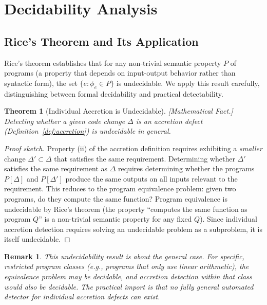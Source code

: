 \documentclass[11pt, a4paper, logo, copyright]{googledeepmind}
\newtheorem{theorem}{Theorem}[section]
\newtheorem*{remark}{Remark}
\begin{document}
\section{Decidability Analysis}
\label{sec:decidability}

\subsection{Rice's Theorem and Its Application}

Rice's theorem \citep{rice1953} establishes that for any non-trivial semantic property $P$ of programs (a property that depends on input-output behavior rather than syntactic form), the set $\{e : \phi_e \in P\}$ is undecidable. We apply this result carefully, distinguishing between formal decidability and practical detectability.

\begin{theorem}[Individual Accretion is Undecidable]
\label{thm:undecidable}
\emph{[Mathematical Fact.]} Detecting whether a given code change $\Delta$ is an accretion defect (Definition~\ref{def:accretion}) is undecidable in general.
\end{theorem}

\begin{proof}[Proof sketch]
Property (ii) of the accretion definition requires exhibiting a \emph{smaller} change $\Delta' \subset \Delta$ that satisfies the same requirement. Determining whether $\Delta'$ satisfies the same requirement as $\Delta$ requires determining whether the programs $P[\Delta]$ and $P[\Delta']$ produce the same outputs on all inputs relevant to the requirement. This reduces to the program equivalence problem: given two programs, do they compute the same function? Program equivalence is undecidable by Rice's theorem (the property ``computes the same function as program $Q$'' is a non-trivial semantic property for any fixed $Q$). Since individual accretion detection requires solving an undecidable problem as a subproblem, it is itself undecidable.
\end{proof}

\begin{remark}
This undecidability result is about the \emph{general} case. For specific, restricted program classes (e.g., programs that only use linear arithmetic), the equivalence problem may be decidable, and accretion detection within that class would also be decidable. The practical import is that no fully general automated detector for individual accretion defects can exist.
\end{remark}
\end{document}
